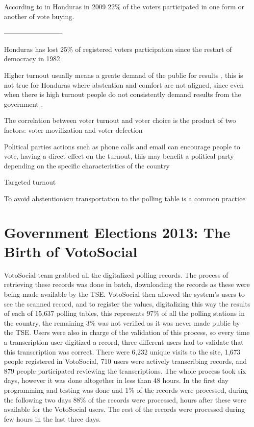 \documentclass[a4paper,10pt]{article}
\begin{document}
According to \cite{gonza2014} in Honduras in 2009 22\% of the voters participated in one form or another of vote buying.

--------------------------

Honduras has lost 25\% of registered voters participation since the restart of democracy in 1982 \citep{romero2014}

Higher turnout usually means a greate demand of the public for results \citep{mac2003}, this is not true for Honduras where abstention and comfort are not aligned, since even when there is high turnout people do not consistently demand results from the government \citep{romero2014}.

The correlation between voter turnout and voter choice is the product of two factors: voter movilization and voter defection \citep{osborn2010}

Political parties actions such as phone calls and email can encourage people to vote, having a direct effect on the turnout, this may benefit a political party depending on the specific characteristics of the country \citep{osborn2010}

Targeted turnout

To avoid abstentionism transportation to the polling table is a common practice \citep{romero2014}




\section{Government Elections 2013: The Birth of VotoSocial}

VotoSocial team grabbed all the digitalized polling records. The process of retrieving these records was done in batch, downloading the records as these were being made available by the TSE. VotoSocial then allowed the system's users to see the scanned record, and to register the values, digitalizing this way the results of each of 15,637 polling tables, this represents 97\% of all the polling stations in the country, the remaining 3\% was not verified as it was never made public by the TSE. Users were also in charge of the validation of this process, so every time a transcription user digitized a record, three different users had to validate that this transcription was correct. There were 6,232 unique visits to the site, 1,673 people registered in VotoSocial, 710 users were actively transcribing records, and 879 people participated reviewing the transcriptions. The whole process took six days, however it was done altogether in less than 48 hours. In the first day programming and testing was done and 1\% of the records were processed, during the following two days 88\% of the records were processed, hours after these were available for the VotoSocial users. The rest of the records were processed during few hours in the last three days.
\end{document}
